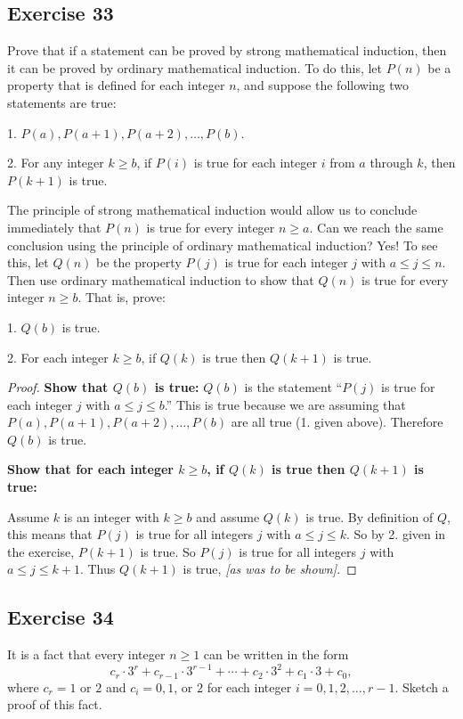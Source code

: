 \documentclass[14pt]{extarticle}
\begin{document}
\subsection{Exercise 33}
Prove that if a statement can be proved by strong mathematical induction, then it can be proved by ordinary mathematical induction. To do this, let $P(n)$ be a property that is defined for each integer $n$, and suppose the following two statements are true:

1. $P(a), P(a + 1), P(a + 2), \ldots, P(b)$.

2. For any integer $k \geq b$, if $P(i)$ is true for each
integer $i$ from $a$ through $k$, then $P(k + 1)$ is true.

The principle of strong mathematical induction would allow us to conclude immediately that $P(n)$ is true for every integer $n \geq a$. Can we reach the same conclusion using the principle of ordinary mathematical induction? Yes! To see this, let $Q(n)$ be the property $P(j)$ is true for each integer $j$ with $a \leq j \leq n$. Then use ordinary mathematical induction to show that $Q(n)$ is true for every integer $n \geq b$. That is, prove:

1. $Q(b)$ is true.

2. For each integer $k \geq b$, if $Q(k)$ is true then $Q(k + 1)$ is true.

\begin{proof}
{\bf Show that $Q(b)$ is true:} $Q(b)$ is the statement ``$P(j)$ is true for each integer $j$ with $a \leq j \leq b$.'' 
This is true because we are assuming that $P(a), P(a + 1), P(a + 2), \ldots, P(b)$ are all true (1. given above).
Therefore $Q(b)$ is true.

{\bf Show that for each integer $k \geq b$, if $Q(k)$ is true then $Q(k+1)$ is true:}

Assume $k$ is an integer with $k \geq b$ and assume $Q(k)$ is true. By definition of $Q$, this means that $P(j)$ is
true for all integers $j$ with $a \leq j \leq k$.
So by 2. given in the exercise, $P(k+1)$ is true.
So $P(j)$ is true for all integers $j$ with $a \leq j \leq k+1$. Thus $Q(k+1)$ is true, {\it [as was to be shown].}
\end{proof}

\subsection{Exercise 34}
It is a fact that every integer $n \geq 1$ can be written
in the form
\[
c_r \cdot 3^r + c_{r-1} \cdot 3^{r-1} + \cdots + c_2 \cdot 3^2 + c_1 \cdot 3 + c_0,
\]
where $c_r = 1$ or $2$ and $c_i = 0, 1$, or $2$ for each
integer $i = 0, 1, 2, \ldots, r - 1$. Sketch a proof of this fact.
\end{document}
